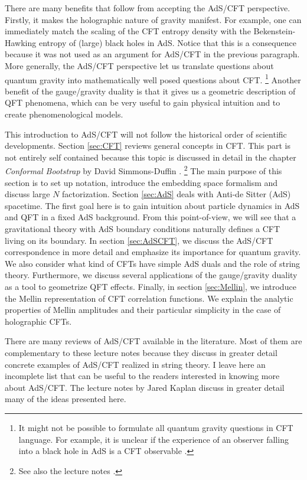 \documentclass{ws-rv9x6}
\begin{document}
There are many benefits that follow from accepting the AdS/CFT perspective.
Firstly, it makes the holographic nature of gravity manifest. For example, one can immediately match the scaling of the CFT entropy density with the  Bekenstein-Hawking entropy of (large) black holes in AdS. Notice that this is a consequence because it was not used as an argument for AdS/CFT in the previous paragraph. More generally, the AdS/CFT perspective let us translate questions about quantum gravity into mathematically well posed questions about CFT. \footnote{It might not be possible to formulate all quantum gravity questions in CFT language. For example, it is unclear if the experience of an observer falling into a black hole in AdS is a CFT observable \cite{arXiv:1207.3123}.}
Another benefit of the gauge/gravity duality is that it gives us a geometric description of  QFT phenomena, which can be very useful to gain physical
intuition and to create phenomenological models.
 


This introduction to AdS/CFT will not follow the historical order
of scientific developments.
Section \ref{sec:CFT} reviews general concepts in CFT. This part is not entirely self contained because this topic is discussed in  detail in the chapter
\emph{Conformal Bootstrap}  by David
Simmons-Duffin \cite{arXiv:1602.07982}. \footnote{See also the lecture notes \cite{arXiv:1601.05000, arXiv:1511.04074}.}
The main purpose of this section is to set up notation,
introduce the embedding space formalism and discuss large $N$ factorization.
Section \ref{sec:AdS} deals with Anti-de Sitter (AdS) spacetime. The first goal
here is to gain intuition about particle dynamics in AdS and 
QFT in a fixed AdS background.
From this point-of-view, we will see
that a gravitational theory with AdS boundary conditions naturally
defines a CFT living on its boundary. In section \ref{sec:AdSCFT},
we discuss the AdS/CFT correspondence in more detail and emphasize
its importance for quantum gravity. We also consider what kind of
CFTs have simple AdS duals and the role of string theory. Furthermore,
we discuss several applications of the gauge/gravity duality as a
tool to geometrize QFT effects.
Finally, in section \ref{sec:Mellin}, we introduce the Mellin representation of CFT correlation functions. We explain the analytic properties of Mellin amplitudes and their particular simplicity in the case of holographic CFTs. 

There are many reviews of AdS/CFT available in the literature. Most
of them are complementary to these lecture notes because they discuss
in greater detail concrete examples of AdS/CFT realized in string
theory. I leave here an incomplete list \cite{hep-th/9905111, arXiv:0909.0518, hep-th/0201253,   arXiv:0709.1523, arXiv:0712.0689, arXiv:0901.0935, arXiv:0903.3246,  arXiv:1010.6134, arXiv:1106.4324}
that can be useful to the readers interested in knowing more about
AdS/CFT. 
The lecture notes \cite{JaredAdSCFT} by Jared Kaplan discuss in greater detail many of the ideas presented here.
\end{document}
